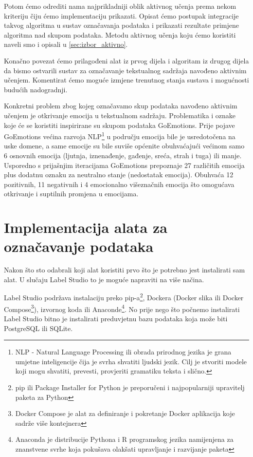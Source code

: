 \documentclass[times, utf8, zavrsni, numeric]{fer}
\begin{document}
Potom ćemo odrediti nama najprikladniji oblik aktivnog učenja prema nekom kriteriju čiju ćemo implementaciju prikazati. Opisat ćemo postupak integracije takvog algoritma u sustav označavanja podataka i prikazati rezultate primjene algoritma nad skupom podataka. Metodu aktivnog učenja koju ćemo koristiti naveli smo i opisali u \autoref{sec:izbor_aktivno}.

Konačno povezat ćemo prilagođeni alat iz prvog dijela i algoritam iz drugog dijela da bismo ostvarili sustav za označavanje tekstualnog sadržaja navođeno aktivnim učenjem. Komentirat ćemo moguće izmjene trenutnog stanja sustava i mogućnosti budućih nadogradnji.

Konkretni problem zbog kojeg označavamo skup podataka navođeno aktivnim učenjem je otkrivanje emocija u tekstualnom sadržaju.
Problematika i oznake koje će se koristiti inspirirane su skupom podataka GoEmotions. Prije pojave GoEmotions većina razvoja NLP\footnote{NLP - Natural Language Processing ili obrada prirodnog jezika je grana umjetne inteligencije čija je svrha shvatiti ljudski jezik. Cilj je stvoriti modele koji mogu shvatiti, prevesti, provjeriti gramatiku teksta i slično.} u području emocija bile je usredotočena na uske domene, a same emocije su bile suviše općenite obuhvaćajući većinom samo 6 osnovnih emocija (ljutnja, iznenađenje, gađenje, sreća, strah i tuga) ili manje. Usporedno s prijašnjim iteracijama GoEmotions prepoznaje 27 različitih emocija plus dodatnu oznaku za neutralno stanje (nedostatak emocija). Obuhvaća 12 pozitivnih, 11 negativnih i 4 emocionalno višeznačnih emocija što omogućava otkrivanje i suptilnih promjena u emocijama. \citep{goemotions2021}


\section{Implementacija alata za označavanje podataka}
\label{sec:implemetacija_alata}

Nakon što sto odabrali koji alat koristiti prvo što je potrebno jest instalirati sam alat.
U slučaju Label Studio to je moguće napraviti na više načina.

Label Studio podržava instalaciju preko pip-a\footnote{pip ili Package Installer for Python je preporučeni i najpopularniji upravitelj paketa za Python}, Dockera (Docker slika ili Docker Compose\footnote{Docker Compose je alat za definiranje i pokretanje Docker aplikacija koje sadrže više kontejnera}), izvornog koda ili Anaconde\footnote{Anaconda je distribucije Pythona i R programskog jezika namijenjena za znanstvene svrhe koja pokušava olakšati upravljanje i razvijanje paketa}.
No prije nego što počnemo instalirati Label Studio bitno je instalirati preduvjetnu bazu podataka koja može biti PostgreSQL ili SQLite.
\end{document}

